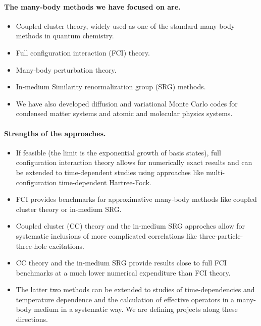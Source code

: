 \documentclass[a4wide,10pt]{article}
\begin{document}
\paragraph{The many-body methods we have focused on are.}
\begin{itemize}
\item Coupled cluster theory, widely used as one of the standard many-body methods in quantum chemistry.

\item Full configuration interaction (FCI) theory.

\item Many-body perturbation theory.

\item In-medium Similarity renormalization group (SRG) methods.

\item We have also developed diffusion and variational Monte Carlo codes for condensed matter systems and atomic and molecular physics systems.
\end{itemize}

\noindent
\paragraph{Strengths of the approaches.}
\begin{itemize}
\item If feasible (the limit is the exponential growth of basis states), full configuration interaction theory allows for numerically exact results and can be extended to time-dependent studies using approaches like multi-configuration time-dependent Hartree-Fock.

\item FCI provides benchmarks for approximative many-body methods like coupled cluster theory or in-medium SRG.

\item Coupled cluster (CC) theory and the in-medium SRG approches allow for systematic inclusions of more complicated correlations like three-particle-three-hole excitations.

\item CC theory and the in-medium SRG provide results close to full FCI benchmarks at a much lower numerical expenditure than FCI theory. 

\item The latter two methods can be extended to studies of time-dependencies and temperature dependence and the calculation of effective operators in a many-body medium in a systematic way. We are defining projects along these directions. 
\end{itemize}
\end{document}
